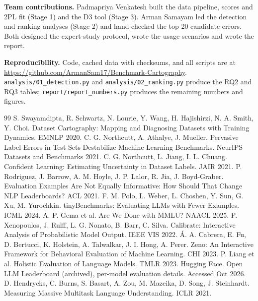\documentclass[10pt]{article}
\begin{document}
\textbf{Team contributions.} Padmapriya Venkatesh built the data pipeline, scores and 2PL fit (Stage 1)
and the D3 tool (Stage 3). Arman Samayam led the detection and ranking analyses (Stage 2) and hand-checked the top 20
candidate errors. Both
designed the expert-study protocol, wrote the usage scenarios and wrote the report.

\textbf{Reproducibility.} Code, cached data with checksums, and all scripts are at
\url{https://github.com/ArmanSam17/Benchmark-Cartography}. \texttt{analysis/01\_detection.py} and
\texttt{analysis/02\_ranking.py} produce the RQ2 and RQ3 tables; \texttt{report/report\_numbers.py}
produces the remaining numbers and figures.

\small
\begin{thebibliography}{99}\setlength{\itemsep}{1pt}
 S. Swayamdipta, R. Schwartz, N. Lourie, Y. Wang, H. Hajishirzi, N. A. Smith, Y. Choi.
  Dataset Cartography: Mapping and Diagnosing Datasets with Training Dynamics. EMNLP 2020.
 C. G. Northcutt, A. Athalye, J. Mueller. Pervasive Label Errors in Test Sets
  Destabilize Machine Learning Benchmarks. NeurIPS Datasets and Benchmarks 2021.
 C. G. Northcutt, L. Jiang, I. L. Chuang. Confident Learning: Estimating Uncertainty in
  Dataset Labels. JAIR 2021.
 P. Rodriguez, J. Barrow, A. M. Hoyle, J. P. Lalor, R. Jia, J. Boyd-Graber.
  Evaluation Examples Are Not Equally Informative: How Should That Change NLP Leaderboards? ACL 2021.
 F. M. Polo, L. Weber, L. Choshen, Y. Sun, G. Xu, M. Yurochkin. tinyBenchmarks:
  Evaluating LLMs with Fewer Examples. ICML 2024.
 A. P. Gema et al. Are We Done with MMLU? NAACL 2025.
 P. Xenopoulos, J. Rulff, L. G. Nonato, B. Barr, C. Silva. Calibrate: Interactive
  Analysis of Probabilistic Model Output. IEEE VIS 2022.
 \'A. A. Cabrera, E. Fu, D. Bertucci, K. Holstein, A. Talwalkar, J. I. Hong, A. Perer.
  Zeno: An Interactive Framework for Behavioral Evaluation of Machine Learning. CHI 2023.
 P. Liang et al. Holistic Evaluation of Language Models. TMLR 2023.
 Hugging Face. Open LLM Leaderboard (archived), per-model evaluation details.
  Accessed Oct 2026.
 D. Hendrycks, C. Burns, S. Basart, A. Zou, M. Mazeika, D. Song, J. Steinhardt.
  Measuring Massive Multitask Language Understanding. ICLR 2021.
\end{thebibliography}
\end{document}
